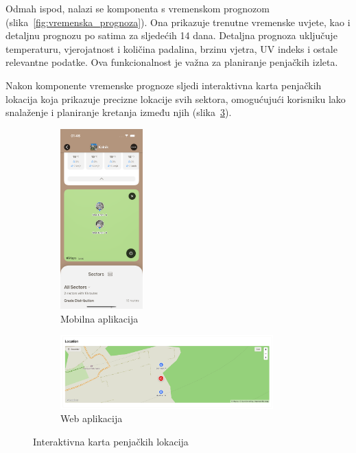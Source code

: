 Odmah ispod, nalazi se komponenta s vremenskom prognozom (slika~\ref{fig:vremenska_prognoza}). Ona prikazuje trenutne vremenske uvjete, kao i detaljnu prognozu po satima za sljedećih 14 dana. Detaljna prognoza uključuje temperaturu, vjerojatnost i količina padalina, brzinu vjetra, UV indeks i ostale relevantne podatke. Ova funkcionalnost je važna za planiranje penjačkih izleta.


Nakon komponente vremenske prognoze sljedi interaktivna karta penjačkih lokacija koja prikazuje precizne lokacije svih sektora, omogućujući korisniku lako snalaženje i planiranje kretanja između njih (slika~\ref{fig:interaktivna_karta}). 

\begin{figure}[H]
    \centering
    \begin{subfigure}[b]{\textwidth}
        \centering
        \includegraphics[width=0.35\textwidth]{images/implementacija/crag-details/crag-map.png}
        \caption{Mobilna aplikacija}
        \label{fig:interaktivna_karta_mob}
    \end{subfigure}
    \hfill
    \begin{subfigure}[b]{\textwidth}
        \centering
        \includegraphics[width=0.9\textwidth]{images/implementacija/web/crag-details/crag-map.png}
        \caption{Web aplikacija}
        \label{fig:interaktivna_karta_web}
    \end{subfigure}
    \caption{Interaktivna karta penjačkih lokacija}
    \label{fig:interaktivna_karta}
\end{figure}

